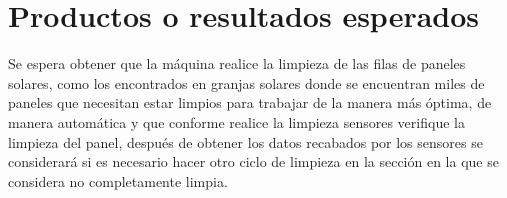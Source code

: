 \chapter{Productos o resultados esperados}\label{Cap6}
Se espera obtener que la máquina realice la limpieza de las filas de paneles solares, como los encontrados en granjas solares donde  se encuentran miles de paneles que necesitan estar limpios para trabajar de la manera más óptima, de manera automática y que conforme realice la limpieza sensores verifique la limpieza del panel, después de obtener los datos recabados por los sensores se considerará si es necesario hacer otro ciclo de limpieza en la sección en la que se considera no completamente limpia.